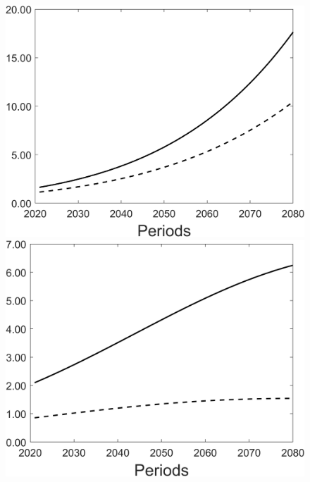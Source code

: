 \begin{figure}[h!!]
\begin{minipage}[]{0.32\textwidth}
	\end{minipage}
	\begin{minipage}[]{0.32\textwidth}
		\includegraphics[width=1\textwidth]{../../codding_model/Own/figures/Rep_agent/staticRam_LF_separate_yd_periods59_eppsilon0.40_zeta1.40_Ad08_Ac04_thetac0.70_thetad0.56_HetGrowth1_tauul0.181_util0_withtarget0_lgd0.png}
	\end{minipage}
	\begin{minipage}[]{0.32\textwidth}
		\includegraphics[width=1\textwidth]{../../codding_model/Own/figures/Rep_agent/staticRam_LF_separate_xd_periods59_eppsilon0.40_zeta1.40_Ad08_Ac04_thetac0.70_thetad0.56_HetGrowth1_tauul0.181_util0_withtarget0_lgd0.png}

\end{minipage}
\end{figure}
